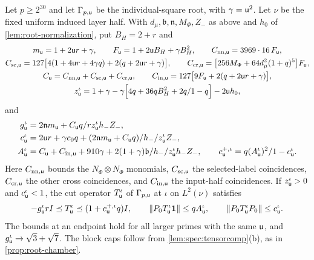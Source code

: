 \begin{proposition}\label{prop:root-layer}
Let $p\ge2^{30}$ and let $\Gamma_{p,\mathsf u}$ be the individual-square
root, with $\gamma=\mathsf u^2$. Let $\nu$ be the fixed uniform induced layer
half. With $d_\mu,\mathfrak b,\mathfrak n,M_\Phi,Z_-$ as above and
$h_0$ of \cref{lem:root-normalization}, put
$B_H=2+r$ and
\begin{gather*}
 m_\mathsf u=1+2\mathsf u r+\gamma,\qquad F_\mathsf u=1+2\mathsf u B_H+\gamma B_H^2,\qquad
 C_{\rm nn,\mathsf u}=3969\cdot16\,F_\mathsf u,\\
 C_{\rm sc,\mathsf u}=127\bigl[4(1+4\mathsf u r+4\gamma q)+2(q+2\mathsf u r+\gamma)\bigr],\qquad
 C_{\rm cr,\mathsf u}=\bigl[256M_\Phi+64d_\mu^2(1+q)^5\bigr]F_\mathsf u,\\
 C_\mathsf u=C_{\rm nn,\mathsf u}+C_{\rm sc,\mathsf u}+C_{\rm cr,\mathsf u},\qquad
 C_{\rm in,\mathsf u}=127\bigl[9F_\mathsf u+2(q+2\mathsf u r+\gamma)\bigr],\\
 z^\iota_\mathsf u=1+\gamma-\gamma\Bigl[4q+36qB_H^2+2q/1-q\Bigr]-2\mathsf u h_0,
\end{gather*}
and
\begin{align*}
 g^\iota_\mathsf u&=2\mathfrak nm_\mathsf u+C_\mathsf u q/rz^\iota_\mathsf u h_-Z_-,\\
 c^\iota_\mathsf u&=2\mathsf u r+\gamma c_0q
   +(2\mathfrak nm_\mathsf u+C_\mathsf u q)/h_-/z^\iota_\mathsf u Z_-,\\
 A^\iota_\mathsf u&=C_\mathsf u+C_{\rm in,\mathsf u}+910\gamma
   +2(1+\gamma)\mathfrak b/h_-/z^\iota_\mathsf u h_-Z_-,\qquad
 c^{+,\iota}_\mathsf u=q(A^\iota_\mathsf u)^2/1-c^\iota_\mathsf u.
\end{align*}
Here $C_{\rm nn,\mathsf u}$ bounds the $N_\Phi\otimes N_\Phi$ monomials,
$C_{\rm sc,\mathsf u}$ the selected-label coincidences, $C_{\rm cr,\mathsf u}$ the other
cross coincidences, and $C_{\rm in,\mathsf u}$ the input-half coincidences. If
$z^\iota_\mathsf u>0$ and $c^\iota_\mathsf u<1$, the cut operator $T^\iota_\mathsf u$ of
$\Gamma_{p,\mathsf u}$ at $\iota$ on $L^2(\nu)$ satisfies
\[
 -g^\iota_\mathsf u rI\preceq T^\iota_\mathsf u\preceq(1+c^{+,\iota}_\mathsf u q)I,\qquad
 \|P_0T^\iota_\mathsf u\mathbf 1\|\le qA^\iota_\mathsf u,\qquad\|P_0T^\iota_\mathsf u P_0\|\le c^\iota_\mathsf u .
\]
The bounds at an endpoint hold for all larger primes with the same $\mathsf u$, and
$g^\iota_\mathsf u\to\sqrt3+\sqrt7$. The block caps follow from \cref{lem:spec:tensorcomp}(b), as in
\cref{prop:root-chamber}.
\end{proposition}

